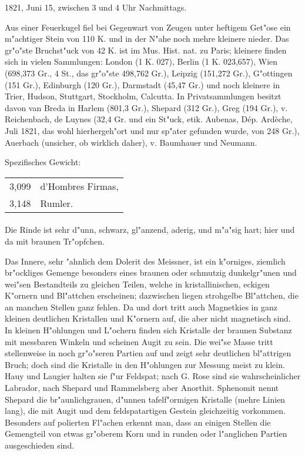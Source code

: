 \documentclass[a4paper, 11pt, oneside]{article}
\begin{document}
1821, Juni 15, zwischen 3 und 4 Uhr Nachmittags.

Aus einer Feuerkugel fiel bei Gegenwart von Zeugen unter heftigem Get"ose ein m"achtiger Stein von 110 K. und in der N"ahe noch mehre kleinere nieder. Das gr"o"ste Bruchst"uck von 42 K. ist im Mus. Hist. nat. zu Paris; kleinere finden sich in vielen Sammlungen: London (1 K. 027), Berlin (1 K. 023,657), Wien (698,373 Gr., 4 St., das gr"o"ste 498,762 Gr.), Leipzig (151,272 Gr.), G"ottingen (151 Gr.), Edinburgh (120 Gr.), Darmstadt (45,47 Gr.) und noch kleinere in Trier, Hudson, Stuttgart, Stockholm, Calcutta. In Privatsammlungen besitzt davon van Breda in Harlem (801,3 Gr.), Shepard (312 Gr.), Greg (194 Gr.), v. Reichenbach, de Luynes (32,4 Gr. und ein St"uck, etik. Aubenas, Dép. Ardèche, Juli 1821, das wohl hierhergeh"ort und nur sp"ater gefunden wurde, von 248 Gr.), Auerbach (unsicher, ob wirklich daher), v. Baumhauer und Neumann.

Spezifisches Gewicht:
\begin{table}[!ht]
    \centering
    \begin{tabular}{l l}
        3,099 & d'Hombres Firmas,\\
        3,148 & Rumler.
    \end{tabular}
\end{table}
\paragraph{}
Die Rinde ist sehr d"unn, schwarz, gl"anzend, aderig, und m"a"sig hart; hier und da mit braunen Tr"opfchen.

Das Innere, sehr "ahnlich dem Dolerit des Meissner, ist ein k"orniges, ziemlich br"ockliges Gemenge besonders eines braunen oder schmutzig dunkelgr"unen und wei"sen Bestandteils zu gleichen Teilen, welche in kristallinischen, eckigen K"ornern und Bl"attchen erscheinen; dazwischen liegen strohgelbe Bl"attchen, die an manchen Stellen ganz fehlen. Da und dort tritt auch Magnetkies in ganz kleinen deutlichen Kristallen und K"ornern auf, die aber nicht magnetisch sind. In kleinen H"ohlungen und L"ochern finden sich Kristalle der braunen Substanz mit messbaren Winkeln und scheinen Augit zu sein. Die wei"se Masse tritt stellenweise in noch gr"o"seren Partien auf und zeigt sehr deutlichen bl"attrigen Bruch; doch sind die Kristalle in den H"ohlungen zur Messung meist zu klein. Hauy und Laugier halten sie f"ur Feldspat; nach G. Rose sind sie wahrscheinlicher Labrador, nach Shepard und Rammelsberg aber Anorthit. Sphenomit nennt Shepard die br"aunlichgrauen, d"unnen tafelf"ormigen Kristalle (mehre Linien lang), die mit Augit und dem feldspatartigen Gestein gleichzeitig vorkommen. Besonders auf polierten Fl"achen erkennt man, dass an einigen Stellen die Gemengteil von etwas gr"oberem Korn und in runden oder l"anglichen Partien ausgeschieden sind.
\end{document}
